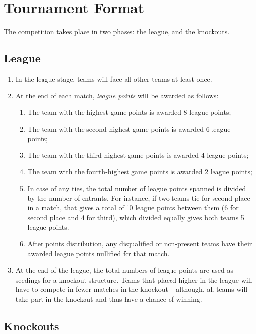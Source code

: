\section{Tournament Format}

The competition takes place in two phases: the league, and the knockouts.

\subsection{League}

\begin{enumerate}
  \item In the league stage, teams will face all other teams at least once.
  \item At the end of each match, \emph{league points} will be awarded as
        follows:
    \begin{enumerate}
      \item The team with the highest game points is awarded 8 league points;
      \item The team with the second-highest game points is awarded 6 league
            points;
      \item The team with the third-highest game points is awarded 4 league
            points;
      \item The team with the fourth-highest game points is awarded 2 league
            points;
      \item In case of any ties, the total number of league points spanned is
            divided by the number of entrants. For instance, if two teams tie
            for second place in a match, that gives a total of 10 league points
            between them (6 for second place and 4 for third), which divided
            equally gives both teams 5 league points.
      \item After points distribution, any disqualified or non-present teams
            have their awarded league points nullified for that match.
    \end{enumerate}
  \item At the end of the league, the total numbers of league points are used as
        seedings for a knockout structure. Teams that placed higher in the
        league will have to compete in fewer matches in the knockout --
        although, all teams will take part in the knockout and thus have a
        chance of winning.
\end{enumerate}

\subsection{Knockouts}

